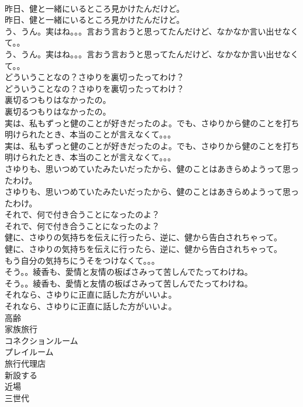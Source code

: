 \documentclass[8pt]{extreport}
\begin{document}
\begin{CJK}{UTF8}{min}
\\	昨日、健と一緒にいるところ見かけたんだけど。	
\\	昨日、健と一緒にいるところ見かけたんだけど。 
\\	う、うん。実はね。。。言おう言おうと思ってたんだけど、なかなか言い出せなくて。。	
\\	う、うん。実はね。。。言おう言おうと思ってたんだけど、なかなか言い出せなくて。。 
\\	どういうことなの？さゆりを裏切ったってわけ？	
\\	どういうことなの？さゆりを裏切ったってわけ？ 
\\	裏切るつもりはなかったの。	
\\	裏切るつもりはなかったの。 
\\	実は、私もずっと健のことが好きだったのよ。でも、さゆりから健のことを打ち明けられたとき、本当のことが言えなくて。。。	
\\	実は、私もずっと健のことが好きだったのよ。でも、さゆりから健のことを打ち明けられたとき、本当のことが言えなくて。。。 
\\	さゆりも、思いつめていたみたいだったから、健のことはあきらめようって思ったわけ。	
\\	さゆりも、思いつめていたみたいだったから、健のことはあきらめようって思ったわけ。 
\\	それで、何で付き合うことになったのよ？	
\\	それで、何で付き合うことになったのよ？ 
\\	健に、さゆりの気持ちを伝えに行ったら、逆に、健から告白されちゃって。	
\\	健に、さゆりの気持ちを伝えに行ったら、逆に、健から告白されちゃって。 
\\	もう自分の気持ちにうそをつけなくて。。。	
\\	そう。。綾香も、愛情と友情の板ばさみって苦しんでたってわけね。	
\\	そう。。綾香も、愛情と友情の板ばさみって苦しんでたってわけね。 
\\	それなら、さゆりに正直に話した方がいいよ。	
\\	それなら、さゆりに正直に話した方がいいよ。 
\\	高齢
\\	家族旅行
\\	コネクションルーム
\\	プレイルーム
\\	旅行代理店
\\	新設する
\\	近場
\\	三世代

\end{CJK}
\end{document}
